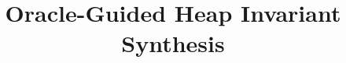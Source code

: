 \title{
 Oracle-Guided Heap Invariant Synthesis
}

\ifdefined\DRAFT
 \pagestyle{fancyplain}
 \rhead{\thedate}
\fi

\authorinfo{}{}{}
